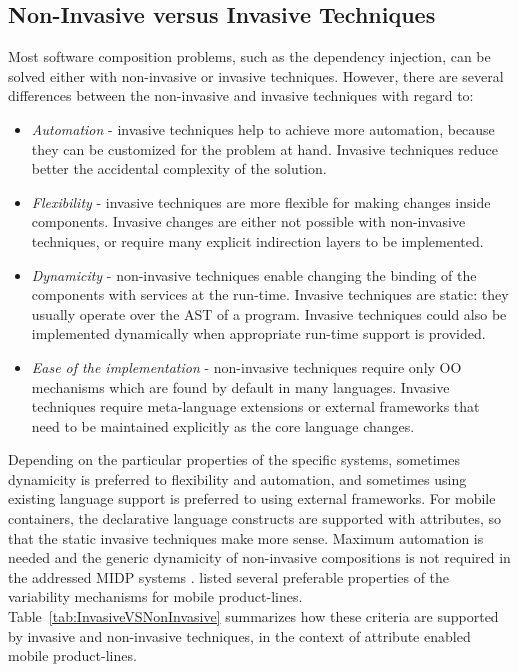 \subsection{Non-Invasive versus Invasive Techniques}

Most software composition problems, such as the dependency injection, can be solved either with non-invasive or invasive techniques. However, there are several differences between the non-invasive and invasive techniques with regard to:

\begin{itemize}
\item \textit{Automation} - invasive techniques help to achieve more automation, because they can be customized for the problem at hand. Invasive techniques reduce better the accidental complexity of the solution.
\item \textit{Flexibility} - invasive techniques are more flexible for making changes inside components. Invasive changes are either not possible with non-invasive techniques, or require many explicit indirection layers to be implemented. 
\item \textit{Dynamicity} - non-invasive techniques enable changing the binding of the components with services at the run-time. Invasive techniques are static: they usually operate over the AST of a program. Invasive techniques could also be implemented dynamically when appropriate run-time support is provided.  %
\item \textit{Ease of the implementation} - non-invasive techniques require only OO mechanisms which are found by default in many languages. Invasive techniques require meta-language extensions or external frameworks that need to be maintained explicitly as the core language changes.
\end{itemize}

Depending on the particular properties of the specific systems, sometimes dynamicity is preferred to flexibility and automation, and sometimes using existing language support is preferred to using external frameworks. For mobile containers, the declarative language constructs are supported with attributes, so that the static invasive techniques make more sense. Maximum automation is needed and the generic dynamicity of non-invasive compositions is not required in the addressed MIDP \cite{www.midp-ota} systems .  listed several preferable properties of the variability mechanisms for mobile product-lines. Table~\ref{tab:InvasiveVSNonInvasive} summarizes how these criteria are supported by invasive and non-invasive techniques, in the context of attribute enabled mobile product-lines.

